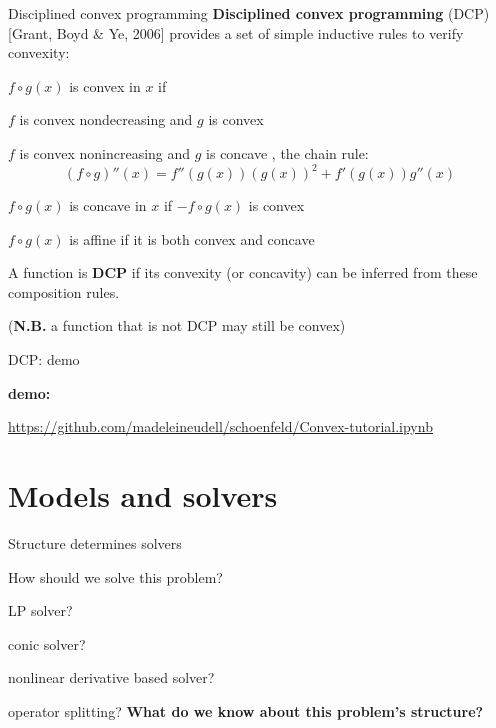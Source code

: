 \documentclass[presentation]{beamer}
\newcommand{\citet}[1]{{\footnotesize{\textmd{[#1]}}}}
\begin{document}
\begin{frame}[fragile]{Disciplined convex programming}
\textbf{Disciplined convex programming} (DCP) \citet{Grant, Boyd \& Ye, 2006}
provides a set of simple inductive rules to verify convexity:
\bit
\item $f \circ g(x)$ is convex in $x$ if
    \bit
    \item $f$ is convex nondecreasing and $g$ is convex
    \item $f$ is convex nonincreasing and $g$ is concave
    \eit
    \cf, the chain rule:
    \[
    (f \circ g)''(x) = f''(g(x))(g(x))^2 + f'(g(x))g''(x)
    \]
\pause
\item $f \circ g(x)$ is concave in $x$ if $-f \circ g(x)$ is convex
\item $f \circ g(x)$ is affine if it is both convex and concave
\eit

A function is \textbf{DCP} if its convexity (or concavity) can be inferred from these composition rules.

\pause (\textbf{N.B.} a function that is not DCP may still be convex)

\end{frame}

\begin{frame}{DCP: demo}

\textbf{demo:}
\begin{center}
\url{https://github.com/madeleineudell/schoenfeld/Convex-tutorial.ipynb}
\end{center}

\end{frame}

\section{Models and solvers}

\begin{frame}{Structure determines solvers}

How should we solve this problem?
\bit
\item LP solver?
\item conic solver?
\item nonlinear derivative based solver?
\item operator splitting?
\eit
\pause
\textbf{What do we know about this problem's structure?}

\end{frame}
\end{document}
